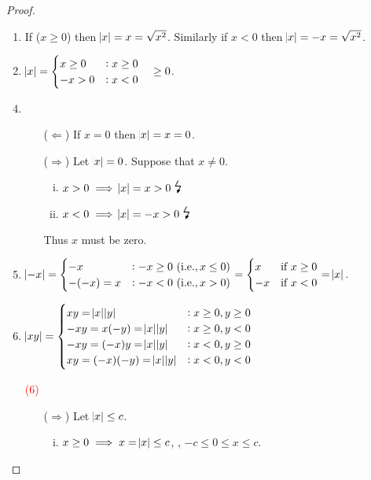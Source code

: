 \documentclass[11pt,openany]{article}
\begin{document}
\begin{proof}
\begin{enumerate}[(1)]
	\item If ($x\geq 0$) then $\abs{x}=x=\sqrt{x^2}$. Similarly if $x< 0$ then $\abs{x}=-x=\sqrt{x^2}$.
	\item $\abs{x}=\begin{cases}
		x\geq 0 &:x\geq 0\\
		-x>0 &:x<0
	\end{cases}\quad\geq 0$.
	\item[]
	\item \begin{itemize}
		\item[($\Leftarrow$)] If $x=0$ then $\abs{x}=x=0$.
		\item[($\Rightarrow$)] Let $\abs{x}=0$. Suppose that $x\neq0$. \begin{enumerate}[(i)]
			\item $x>0\implies \abs{x}=x>0\ \text{\Large\lightning}$
			\item $x<0\implies \abs{x}=-x>0\ \text{\Large\lightning}$
		\end{enumerate} Thus $x$ must be zero.
	\end{itemize}
	\newpage
	\item $\abs{-x}=\begin{cases}
		-x &: -x\geq 0\ (\textnormal{i.e.}, x\leq 0) \\
		-(-x)=x &: -x< 0\ (\textnormal{i.e.}, x> 0)
	\end{cases}=\begin{cases}
	x &\text{if}\ x\geq 0\\
	-x &\text{if}\ x<0
\end{cases}=\abs{x}$.
	\item $\abs{xy}=\begin{cases}
		xy=\abs{x}\abs{y} &:x\geq0,y\geq 0\\
		-xy=x(-y)=\abs{x}\abs{y} &:x\geq0,y< 0\\
		-xy=(-x)y=\abs{x}\abs{y} &:x<0,y\geq 0\\
		xy=(-x)(-y)=\abs{x}\abs{y} &:x<0,y< 0
	\end{cases}$
	\vspace{1cm}
	\item[\textcolor{red}{(6)}] 
	\begin{itemize}
		\item[($\Rightarrow$)] Let $\abs{x}\leq c$. \begin{enumerate}[(i)]
			\item $x\geq 0\implies x=\abs{x}\leq c$, \ie, $-c\leq 0\leq x\leq c$.

\end{enumerate}
\end{itemize}
\end{enumerate}
\end{proof}
\end{document}

